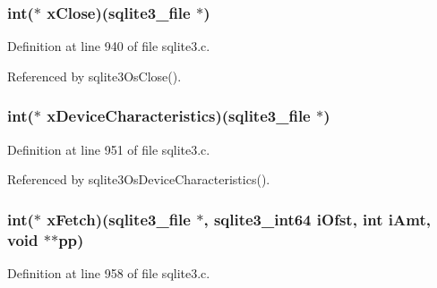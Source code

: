 \subsubsection[{x\+Close}]{\setlength{\rightskip}{0pt plus 5cm}int($\ast$ x\+Close)({\bf sqlite3\+\_\+file} $\ast$)}\label{structsqlite3__io__methods_a38f9e3ecb6bc5ed12f45fca5d85344c8}


Definition at line 940 of file sqlite3.\+c.



Referenced by sqlite3\+Os\+Close().

\hypertarget{structsqlite3__io__methods_a224cdced99e3c80391ccf1ffab06562f}{}
\subsubsection[{x\+Device\+Characteristics}]{\setlength{\rightskip}{0pt plus 5cm}int($\ast$ x\+Device\+Characteristics)({\bf sqlite3\+\_\+file} $\ast$)}\label{structsqlite3__io__methods_a224cdced99e3c80391ccf1ffab06562f}


Definition at line 951 of file sqlite3.\+c.



Referenced by sqlite3\+Os\+Device\+Characteristics().

\hypertarget{structsqlite3__io__methods_a43839d292caa91c4055d068ebb740aae}{}
\subsubsection[{x\+Fetch}]{\setlength{\rightskip}{0pt plus 5cm}int($\ast$ x\+Fetch)({\bf sqlite3\+\_\+file} $\ast$, {\bf sqlite3\+\_\+int64} i\+Ofst, int i\+Amt, void $\ast$$\ast$pp)}\label{structsqlite3__io__methods_a43839d292caa91c4055d068ebb740aae}


Definition at line 958 of file sqlite3.\+c.

\hypertarget{structsqlite3__io__methods_a6ef23eda890920cc3fe586fc9ef1f7b1}{}
